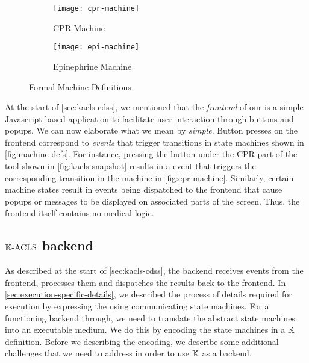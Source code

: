 \begin{figure}[tb!]
\centering
\begin{subfigure}{\textwidth}
  \centering
  \texttt{[image: cpr-machine]}
  \caption{CPR Machine}
  \label{fig:cpr-machine}
\end{subfigure}%
\hfill\newline\hfill\newline\hfill
\begin{subfigure}{\textwidth}
  \centering
  \texttt{[image: epi-machine]}
  \caption{Epinephrine Machine}
  \label{fig:epi-machine}
\end{subfigure}
\caption{Formal Machine Definitions}
\label{fig:machine-defs}
\end{figure}

At the start of \autoref{sec:kacls-cdss}, we mentioned that
the \emph{frontend} of our \CDSS{} is a simple Javascript-based
application to facilitate user interaction through buttons
and popups. We can now elaborate what we mean by \emph{simple}.
Button presses on the frontend correspond to \emph{events}
that trigger transitions in state machines shown in \autoref{fig:machine-defs}.
For instance, pressing the  button under
the CPR part of the tool shown in \autoref{fig:kacls-snapshot} results in a
 event that triggers the corresponding transition in
the machine in \autoref{fig:cpr-machine}.
Similarly, certain machine states result in events being dispatched
to the frontend that cause popups or messages to be displayed
on associated parts of the screen. Thus, the frontend itself contains
no medical logic.

\subsection{$\mathbb{K}{}\text{-ACLS}$ backend}\label{sec:kacls-backend}

As described at the start of \autoref{sec:kacls-cdss},
the backend receives events from the frontend, processes them and
dispatches the results back to the frontend.
In \autoref{sec:execution-specific-details}, we described the
process of details required for execution by expressing
the \BPG{} using communicating state machines. For a functioning
backend through, we need to translate the abstract state machines
into an executable medium. We do this by encoding the
state machines in a $\mathbb{K}$ definition. Before we describing the
encoding, we describe some additional challenges that we need
to address in order to use $\mathbb{K}$ as a \CDSS{} backend.

